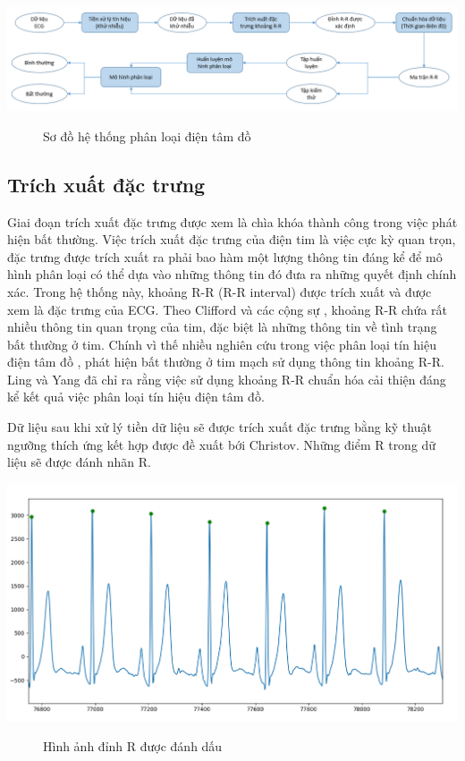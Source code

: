 \begin{center}
    \includegraphics[scale=.5]{image/chapter5/system.png}
    \begin{figure}[htp]
    \begin{center}
    \end{center}
    \caption{Sơ đồ hệ thống phân loại điện tâm đồ}
    \end{figure}
\end{center}

\subsection{Trích xuất đặc trưng}
Giai đoạn trích xuất đặc trưng được xem là chìa khóa thành công trong việc phát hiện bất thường. Việc trích xuất đặc trưng của điện tim là việc cực kỳ quan trọn, đặc trưng được trích xuất ra phải bao hàm một lượng thông tin đáng kể để mô hình phân loại có thể dựa vào những thông tin đó đưa ra những quyết định chính xác. Trong hệ thống này, khoảng R-R (R-R interval) được trích xuất và được xem là đặc trưng của ECG. Theo Clifford và các cộng sự \cite{rr_clifford}, khoảng R-R chứa rất nhiều thông tin quan trọng của tim, đặc biệt là những thông tin về tình trạng bất thường ở tim. Chính vì thế nhiều nghiên cứu trong việc phân loại tín hiệu điện tâm đồ , phát hiện bất thường ở tim mạch sử dụng thông tin khoảng R-R. Ling và Yang \cite{Lin2013} đã chỉ ra rằng việc sử dụng khoảng R-R chuẩn hóa cải thiện đáng kể kết quả việc phân loại tín hiệu điện tâm đồ.

Dữ liệu sau khi xử lý tiền dữ liệu sẽ được trích xuất đặc trưng bằng kỹ thuật ngưỡng thích ứng kết hợp được đề xuất bới Christov. Những điểm R trong dữ liệu sẽ được đánh nhãn R.
\begin{center}
    \includegraphics[scale=.3]{image/chapter5/R_detect.png}
    \begin{figure}[htp]
    \begin{center}
    \end{center}
    \caption{Hình ảnh đỉnh R được đánh dấu}
    \end{figure}
\end{center}

